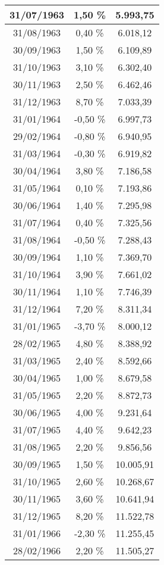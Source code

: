 \begin{center}
\begin{longtable}{|c|c|c|}
31/07/1963 & 1,50 \% & 5.993,75  \\ \hline
31/08/1963 & 0,40 \% & 6.018,12  \\ \hline
30/09/1963 & 1,50 \% & 6.109,89  \\ \hline
31/10/1963 & 3,10 \% & 6.302,40  \\ \hline
30/11/1963 & 2,50 \% & 6.462,46  \\ \hline
31/12/1963 & 8,70 \% & 7.033,39  \\ \hline
31/01/1964 & -0,50 \% & 6.997,73  \\ \hline
29/02/1964 & -0,80 \% & 6.940,95  \\ \hline
31/03/1964 & -0,30 \% & 6.919,82  \\ \hline
30/04/1964 & 3,80 \% & 7.186,58  \\ \hline
31/05/1964 & 0,10 \% & 7.193,86  \\ \hline
30/06/1964 & 1,40 \% & 7.295,98  \\ \hline
31/07/1964 & 0,40 \% & 7.325,56  \\ \hline
31/08/1964 & -0,50 \% & 7.288,43  \\ \hline
30/09/1964 & 1,10 \% & 7.369,70  \\ \hline
31/10/1964 & 3,90 \% & 7.661,02  \\ \hline
30/11/1964 & 1,10 \% & 7.746,39  \\ \hline
31/12/1964 & 7,20 \% & 8.311,34  \\ \hline
31/01/1965 & -3,70 \% & 8.000,12  \\ \hline
28/02/1965 & 4,80 \% & 8.388,92  \\ \hline
31/03/1965 & 2,40 \% & 8.592,66  \\ \hline
30/04/1965 & 1,00 \% & 8.679,58  \\ \hline
31/05/1965 & 2,20 \% & 8.872,73  \\ \hline
30/06/1965 & 4,00 \% & 9.231,64  \\ \hline
31/07/1965 & 4,40 \% & 9.642,23  \\ \hline
31/08/1965 & 2,20 \% & 9.856,56  \\ \hline
30/09/1965 & 1,50 \% & 10.005,91  \\ \hline
31/10/1965 & 2,60 \% & 10.268,67  \\ \hline
30/11/1965 & 3,60 \% & 10.641,94  \\ \hline
31/12/1965 & 8,20 \% & 11.522,78  \\ \hline
31/01/1966 & -2,30 \% & 11.255,45  \\ \hline
28/02/1966 & 2,20 \% & 11.505,27  \\ \hline

\end{longtable}
\end{center}
